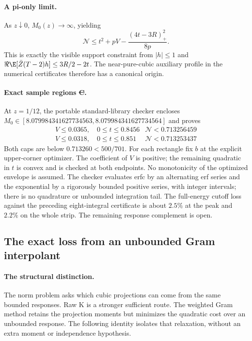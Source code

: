 \paragraph{A pi-only limit.}
As $z\downarrow0$, $M_0(z)\to\infty$, yielding
\[
 \mathcal N\le t^2+pV-\frac{(4t-3R)_+^2}{8p}.
\]
This is exactly the visible support constraint from $|h|\le1$ and
$\Re\E[\bar Z(T-2)h]\le3R/2-2t$. The near-pure-cubic auxiliary
profile in the numerical certificates therefore has a canonical origin.

\paragraph{Exact sample regions \st{C}.}
At $z=1/12$, the portable standard-library checker encloses
$M_0\in[8.079984341627734563,8.079984341627734564]$ and proves
\[
 \begin{array}{c|c}
 V\le0.0365,\quad0\le t\le0.8456&\mathcal N<0.713256459\\
 V\le0.0318,\quad0\le t\le0.851&\mathcal N<0.713253437
 \end{array}
\]
Both caps are below $0.713260<500/701$.
For each rectangle fix $b$ at the explicit upper-corner optimizer.
The coefficient of $V$ is positive; the remaining quadratic in $t$
is convex and is checked at both endpoints. No monotonicity of the
optimized envelope is assumed. The checker evaluates erfc by an
alternating erf series and the exponential by a rigorously bounded
positive series, with integer intervals; there is no quadrature or
unbounded integration tail. The full-energy cutoff loss against the
preceding eight-integral certificate is about $2.5\%$ at the peak and
$2.2\%$ on the whole strip. The remaining response complement is open.

\subsection{The exact loss from an unbounded Gram interpolant}
\label{sec:clipped-response-feasibility}
\paragraph{The structural distinction.}
The norm problem asks which cubic projections can come from the same
bounded responses. Raw K is a stronger sufficient route. The weighted
Gram method retains the projection moments but minimizes the quadratic
cost over an unbounded response. The following identity isolates that
relaxation, without an extra moment or independence hypothesis.


